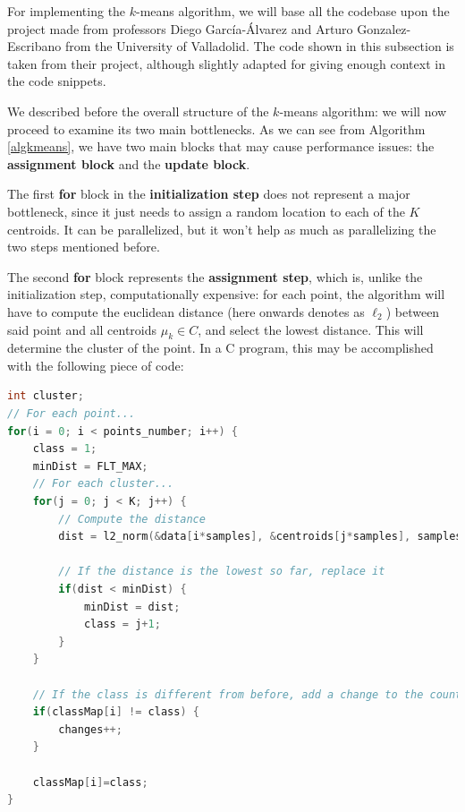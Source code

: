 \documentclass[11pt, journal]{IEEEtran}
\newcommand{\nwl}{

\vspace{11pt}

}
\begin{document}
For implementing the $k$-means algorithm, we will base all the codebase upon the project made from professors Diego García-Álvarez and Arturo Gonzalez-Escribano from the University of Valladolid. The code shown in this subsection is taken from their project, although slightly adapted for giving enough context in the code snippets.
\nwl
We described before the overall structure of the $k$-means algorithm: we will now proceed to examine its two main bottlenecks. As we can see from Algorithm \ref{algkmeans}, we have two main blocks that may cause performance issues: the \textbf{assignment block} and the \textbf{update block}.
\nwl
The first \textbf{for} block in the \textbf{initialization step} does not represent a major bottleneck, since it just needs to assign a random location to each of the $K$ centroids. It can be parallelized, but it won't help as much as parallelizing the two steps mentioned before.
\nwl
The second \textbf{for} block represents the \textbf{assignment step}, which is, unlike the initialization step, computationally expensive: for each point, the algorithm will have to compute the euclidean distance (here onwards denotes as $\ell_2$) between said point and all centroids $\mu_k \in C$, and select the lowest distance. This will determine the cluster of the point. In a C program, this may be accomplished with the following piece of code:
\nwl
\begin{lstlisting}[language = C]
int cluster;
// For each point...
for(i = 0; i < points_number; i++) {
    class = 1;
    minDist = FLT_MAX;
    // For each cluster...
    for(j = 0; j < K; j++) {
        // Compute the distance
        dist = l2_norm(&data[i*samples], &centroids[j*samples], samples);

        // If the distance is the lowest so far, replace it
        if(dist < minDist) {
            minDist = dist;
            class = j+1;
        }
    }
    
    // If the class is different from before, add a change to the counter
    if(classMap[i] != class) {
        changes++;
    }

    classMap[i]=class;
}\end{lstlisting}
\end{document}
